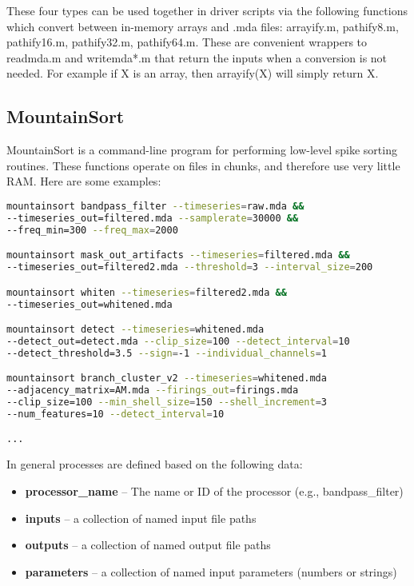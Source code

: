 \documentclass{article}
\begin{document}
These four types can be used together in driver scripts via the following functions which convert between in-memory arrays and .mda files: arrayify.m, pathify8.m, pathify16.m, pathify32.m, pathify64.m. These are convenient wrappers to readmda.m and writemda*.m that return the inputs when a conversion is not needed. For example if X is an array, then arrayify(X) will simply return X.

\subsection{MountainSort}

MountainSort is a command-line program for performing low-level spike sorting routines. These functions operate on files in chunks, and therefore use very little RAM. Here are some examples:
\begin{lstlisting}[language=bash]
mountainsort bandpass_filter --timeseries=raw.mda &&
--timeseries_out=filtered.mda --samplerate=30000 &&
--freq_min=300 --freq_max=2000

mountainsort mask_out_artifacts --timeseries=filtered.mda &&
--timeseries_out=filtered2.mda --threshold=3 --interval_size=200

mountainsort whiten --timeseries=filtered2.mda &&
--timeseries_out=whitened.mda

mountainsort detect --timeseries=whitened.mda
--detect_out=detect.mda --clip_size=100 --detect_interval=10
--detect_threshold=3.5 --sign=-1 --individual_channels=1

mountainsort branch_cluster_v2 --timeseries=whitened.mda
--adjacency_matrix=AM.mda --firings_out=firings.mda
--clip_size=100 --min_shell_size=150 --shell_increment=3
--num_features=10 --detect_interval=10

...
\end{lstlisting}

In general processes are defined based on the following data:
\begin{itemize}
\item{\textbf{processor\_name} -- The name or ID of the processor (e.g., bandpass\_filter)}
\item{\textbf{inputs} -- a collection of named input file paths}
\item{\textbf{outputs} -- a collection of named output file paths}
\item{\textbf{parameters} -- a collection of named input parameters (numbers or strings)}
\end{itemize}
\end{document}

